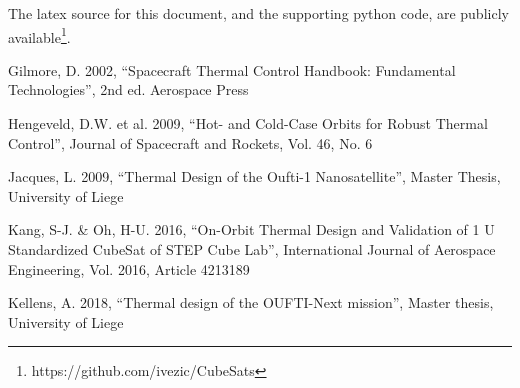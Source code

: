 \documentclass[]{aastex62}
\begin{document}
The latex source for this document, and the supporting python code, are publicly 
available\footnote{https://github.com/ivezic/CubeSats}. 



\vskip 0.2in 
Gilmore, D. 2002, ``Spacecraft Thermal Control Handbook: Fundamental Technologies'', 2nd ed. Aerospace Press 

Hengeveld, D.W. et al. 2009, ``Hot- and Cold-Case Orbits for Robust Thermal Control'', Journal of Spacecraft and 
     \phantom{xxxxxx} Rockets,  Vol. 46, No. 6 

Jacques, L. 2009, ``Thermal Design of the Oufti-1 Nanosatellite'', Master Thesis, University of Liege

Kang, S-J. \& Oh, H-U. 2016, ``On-Orbit Thermal Design and Validation of 1 U Standardized CubeSat of STEP 
\phantom{xxxxxx}  Cube Lab'', 
        International Journal of Aerospace Engineering, Vol. 2016, Article 4213189

Kellens, A. 2018, ``Thermal design of the OUFTI-Next mission'', Master thesis, University of Liege
\end{document}
